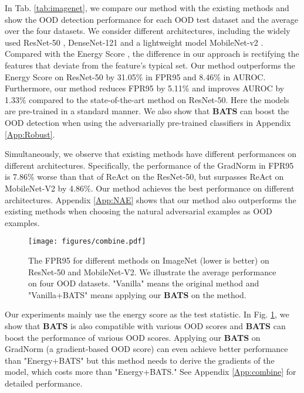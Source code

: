 \documentclass{article}
\begin{document}
In Tab. \ref{tab:imagenet}, we compare our method with the existing methods and show the OOD detection
performance for each OOD test dataset and the average over the four datasets. We consider different architectures, including the widely used ResNet-50 \cite{he2016resnet}, DenseNet-121 \cite{huang2018densenet} and a lightweight model MobileNet-v2 \cite{sandler2019mobilenetv2}. Compared with the Energy Score \cite{liu2020energy}, the difference in our approach is rectifying the features that deviate from the feature's typical set. Our method outperforms the Energy Score on ResNet-50 by 31.05$\%$ in FPR95 and 8.46$\%$ in AUROC. Furthermore, our method reduces FPR95 by 5.11$\%$ and improves AUROC by 1.33$\%$ compared to the state-of-the-art method \cite{sun2021react} on ResNet-50. 
{Here the models are pre-trained in a standard manner.}
We also show that \textbf{BATS} can boost the OOD detection when using the adversarially pre-trained classifiers in Appendix \ref{App:Robust}.

Simultaneously, we observe that existing methods have different performances on different architectures. {Specifically}, the performance of the GradNorm \cite{huang2021importance} in FPR95 is 7.86$\%$ worse than that of ReAct \cite{sun2021react} on the ResNet-50, but surpasses ReAct on MobileNet-V2 by 4.86$\%$. Our method achieves the best performance on different architectures.
Appendix \ref{App:NAE} shows that our method also outperforms the existing methods when choosing the natural adversarial examples \cite{hendrycks2021nae} as OOD examples.


 \begin{figure}[htbp]
\centering
\texttt{[image: figures/combine.pdf]}
\caption{The FPR95 for different methods on ImageNet (lower is better) on ResNet-50 and MobileNet-V2. We illustrate the average performance on four OOD datasets. "Vanilla" means the original method and "Vanilla+BATS" means applying our \textbf{BATS} on the method.}
\label{img:combine}
\end{figure}


Our experiments mainly use the energy score as the test statistic. In Fig. \ref{img:combine}, we show that \textbf{BATS} is also compatible with various OOD scores and \textbf{BATS} can boost the performance of various OOD scores. Applying our \textbf{BATS} on GradNorm \cite{huang2021importance} (a gradient-based OOD score) can even achieve better performance than "Energy+BATS" but this method needs to derive the gradients of the model, which costs more than "Energy+BATS." See Appendix \ref{App:combine} for detailed performance.
\end{document}
